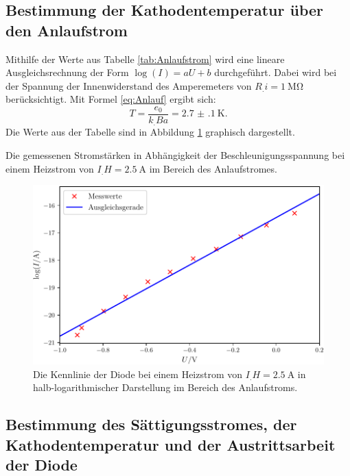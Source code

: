 \subsection{Bestimmung der Kathodentemperatur über den Anlaufstrom}
\label{subsec:Temperatur}

Mithilfe der Werte aus Tabelle \ref{tab:Anlaufstrom} wird eine lineare Ausgleichsrechnung der Form $\log(I)=aU+b$ durchgeführt. Dabei wird bei der Spannung der Innenwiderstand des Amperemeters von $R_.i=\SI{1}{\mega\ohm}$ berücksichtigt. Mit Formel \eqref{eq:Anlauf} ergibt sich:
\[
T = \frac{e_0}{k_.Ba} = \SI{2.7(1)}{\kelvin}\text{.}
\]
Die Werte aus der Tabelle sind in Abbildung \ref{fig:Anlaufstrom} graphisch dargestellt.

\begin{table}
\centering
\caption{Die gemessenen Stromstärken in Abhängigkeit der Beschleunigungsspannung bei einem Heizstrom von $I_.H=\SI{2,5}{\ampere}$ im Bereich des Anlaufstromes.}

\label{tab:Anlaufstrom}
\end{table}

\begin{figure}
\centering
\includegraphics[width=\linewidth-70pt,height=\textheight-70pt,keepaspectratio]{content/images/Anlaufstrom.pdf}
\caption{Die Kennlinie der Diode bei einem Heizstrom von $I_.H=\SI{2,5}{\ampere}$ in halb-logarithmischer Darstellung im Bereich des Anlaufstroms.}
\label{fig:Anlaufstrom}
\end{figure}

\subsection{Bestimmung des Sättigungsstromes, der Kathodentemperatur und der Austrittsarbeit der Diode}

